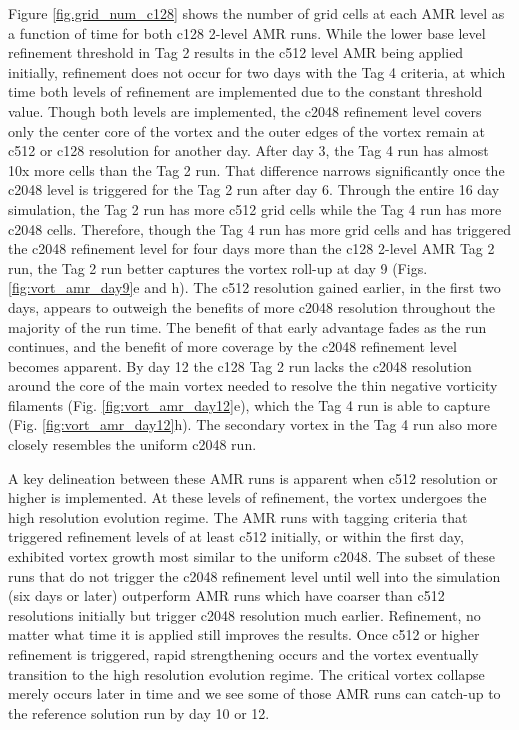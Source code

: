 \documentclass{ametsoc}
\begin{document}
Figure \ref{fig.grid_num_c128} shows the number of grid cells at each AMR 
level as a function of time for both c128 2-level AMR runs.  While the lower 
base level refinement threshold in Tag 2 results in the c512 level AMR being applied
initially, refinement does not occur for two days with the Tag 4 criteria, at which time
both levels of refinement are implemented due 
to the constant threshold value. Though both levels are implemented,
the c2048 refinement level 
covers only the center core of the vortex and 
the outer edges of the vortex remain at
c512 or c128 resolution for another day.
After day 3, the Tag 4 run has almost 10x more 
cells than the Tag 2 run. That difference narrows significantly once the c2048
level is triggered for the Tag 2 run after day 6. 
Through the entire 16 day simulation, the Tag 2 run has more c512 grid
cells while the Tag 4 run has more c2048 cells. Therefore, though the Tag 4 run
has more grid cells and has triggered the c2048 refinement level for four days more than the 
c128 2-level AMR Tag 2 run, the Tag 2 run better captures the vortex roll-up at day 9 
(Figs. \ref{fig:vort_amr_day9}e and h).
The c512 resolution gained earlier, in the first two days, appears to outweigh the benefits 
of more c2048 resolution throughout the majority of the run time. 
The benefit of that early advantage fades as the run continues, and the benefit of more coverage by
the c2048 refinement level becomes apparent. By day 12 
the c128 Tag 2 run lacks the c2048 resolution around the core of the main 
vortex needed to resolve the thin negative vorticity filaments (Fig. \ref{fig:vort_amr_day12}e), 
which the Tag 4 run is able to capture (Fig. \ref{fig:vort_amr_day12}h). 
The secondary vortex in the Tag 4 run also more closely resembles the uniform c2048 run.

A key delineation between these AMR runs is apparent 
when c512 resolution or higher is implemented. At these 
levels of refinement, the vortex undergoes the high resolution evolution regime.
The AMR runs with tagging criteria that triggered refinement levels 
of at least c512 initially, or within the first day, exhibited 
vortex growth most similar to the uniform c2048. 
The subset of these runs that do not trigger the c2048 
refinement level until well into the simulation (six days or later)  
outperform AMR runs which have coarser than c512 resolutions 
initially but trigger c2048 resolution much earlier. 
Refinement, no matter what time it is applied still improves the results. 
Once c512 or higher refinement is triggered, rapid strengthening occurs 
and the vortex eventually transition to the high resolution evolution 
regime. The critical vortex collapse merely occurs later in time and we
see some of those AMR runs can catch-up to the 
reference solution run by day 10 or 12.
\end{document}
